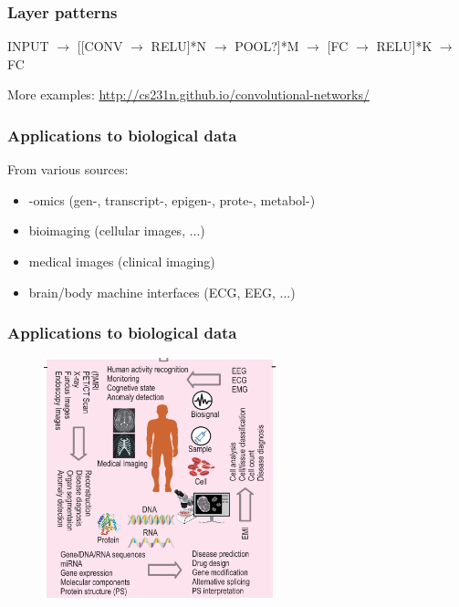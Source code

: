 \begin{frame}
	\frametitle{Layer patterns}

	INPUT $\rightarrow$ [[CONV $\rightarrow$ RELU]*N $\rightarrow$ POOL?]*M $\rightarrow$ [FC $\rightarrow$ 
	RELU]*K $\rightarrow$ FC

	\vskip 1cm

	More examples: \url{http://cs231n.github.io/convolutional-networks/}

\end{frame}

\begin{frame}
	\frametitle{Applications to biological data}

	From various sources:
	\begin{itemize}
		\item -omics (gen-, transcript-, epigen-, prote-, metabol-)
		\item bioimaging (cellular images, ...)
		\item medical images (clinical imaging)
		\item brain/body machine interfaces (ECG, EEG, ...)
	\end{itemize}

\end{frame}

\begin{frame}
        \frametitle{Applications to biological data}

	\begin{figure}
                \includegraphics[width=0.6\textwidth]{Pics/biology.png}
        \end{figure}

\end{frame}

